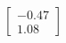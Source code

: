 \documentclass[preview]{standalone}
\begin{document}
\begin{align*}
\begin{bmatrix} -0.47 \\ 1.08 \end{bmatrix}
\end{align*}
\end{document}
